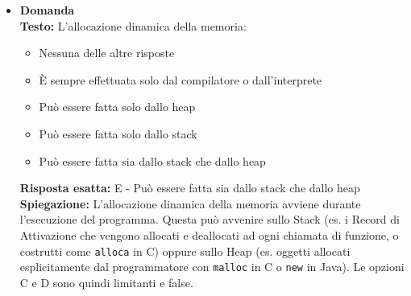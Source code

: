 \documentclass[12pt, a4paper]{article}
\newcounter{domandateoria}
\begin{document}
\begin{itemize}
    \item {}\textbf{Domanda \thedomandateoria} \\
    \textbf{Testo:} L'allocazione dinamica della memoria:
    \begin{itemize}
        \item[A)] Nessuna delle altre risposte
        \item[B)] È sempre effettuata solo dal compilatore o dall'interprete
        \item[C)] Può essere fatta solo dallo heap
        \item[D)] Può essere fatta solo dallo stack
        \item[E)] Può essere fatta sia dallo stack che dallo heap
    \end{itemize}
    \textbf{Risposta esatta:} E - Può essere fatta sia dallo stack che dallo heap \\
    \textbf{Spiegazione:} L'allocazione dinamica della memoria avviene durante l'esecuzione del programma. Questa può avvenire sullo Stack (es. i Record di Attivazione che vengono allocati e deallocati ad ogni chiamata di funzione, o costrutti come \texttt{alloca} in C) oppure sullo Heap (es. oggetti allocati esplicitamente dal programmatore con \texttt{malloc} in C o \texttt{new} in Java). Le opzioni C e D sono quindi limitanti e false.
    \vspace{0.3cm}

\newpage


\end{itemize}
\end{document}
